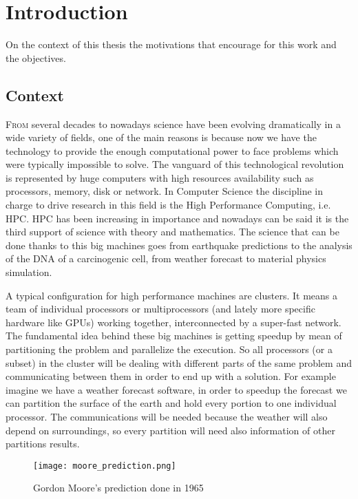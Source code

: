 \chapter{Introduction}

On the context of this thesis the motivations that encourage for this work and
the objectives.

\section{Context}
\lettrine{F}{rom} several decades to nowadays science have been evolving
dramatically in a wide variety of fields, one of the main reasons is because now we
have the technology to provide the enough computational power to face problems
which were typically impossible to solve. The vanguard of this technological
revolution is represented by huge computers with high resources availability
such as processors, memory, disk or network.
In Computer Science the discipline in charge to drive research in this field is 
the High Performance Computing, i.e. HPC. HPC has been increasing in importance 
and nowadays can be said it is the third support of science with theory and 
mathematics. The science that can be done thanks to this big machines goes from 
earthquake predictions to the analysis of the DNA of a carcinogenic cell, from
weather forecast to material physics simulation.

A typical configuration for high performance machines are clusters. It means a 
team of individual processors or multiprocessors (and lately more specific 
hardware like GPUs) working together, interconnected by a super-fast network. 
The fundamental idea behind these big machines is getting speedup by mean of
partitioning the problem and parallelize the execution. So all processors (or a 
subset) in the cluster will be dealing with different parts of the same problem 
and communicating between them in order to end up with a solution. For example 
imagine we have a weather forecast software, in order to speedup the forecast 
we can partition the surface of the earth and hold every portion to one individual
processor. The communications will be needed because the weather will also depend 
on surroundings, so every partition will need also information of other partitions 
results.

\begin{figure}
  \caption{Gordon Moore's prediction done in 1965}
  \label{moore-prediction}
  \centering
    \texttt{[image: moore\_prediction.png]}
\end{figure}


